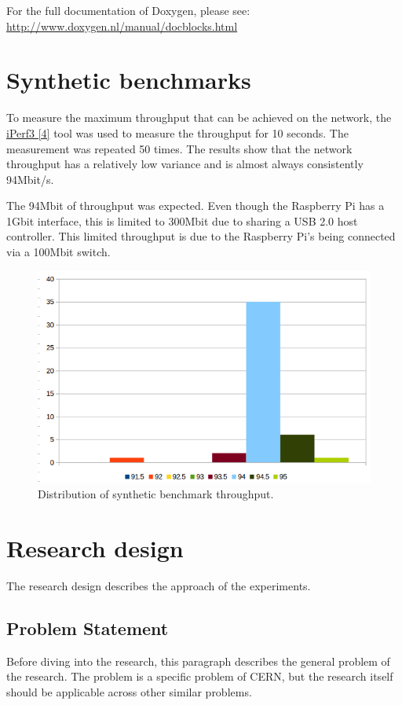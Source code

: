 \documentclass[]{article}
\begin{document}
For the full documentation of Doxygen, please see: \url{http://www.doxygen.nl/manual/docblocks.html}

\section{Synthetic benchmarks}
To measure the maximum throughput that can be achieved on the network, the \hyperref[sec:ref04]{iPerf3 [4]} tool was used to measure the throughput for 10 seconds. The measurement was repeated 50 times. The results show that the network throughput has a relatively low variance and is almost always consistently 94Mbit/s.

The 94Mbit of throughput was expected. Even though the Raspberry Pi has a 1Gbit interface, this is limited to 300Mbit due to sharing a USB 2.0 host controller. This limited throughput is due to the Raspberry Pi’s being connected via a 100Mbit switch.

\begin{center}
	\begin{figure}[H]
		\includegraphics[width=\textwidth]{images/network-benchmark}
		\caption{Distribution of synthetic benchmark throughput.}
		\label{fig:ssh}
	\end{figure}
\end{center}

\section{Research design}
The research design describes the approach of the experiments.

\subsection{Problem Statement}
Before diving into the research, this paragraph describes the general problem of the research. The problem is a specific problem of CERN, but the research itself should be applicable across other similar problems.
\end{document}
